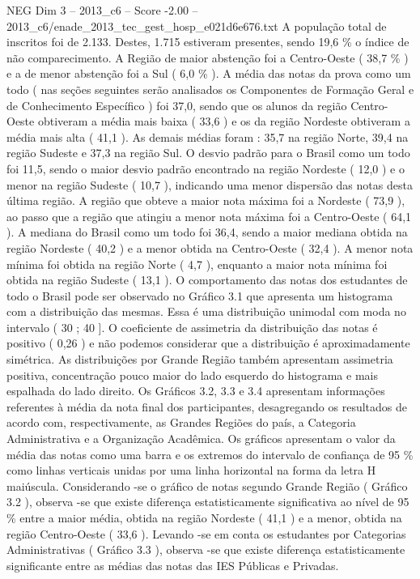\begin{textsample}{NEG Dim 3 – 2013\_c6 – Score -2.00 – 2013\_c6/enade\_2013\_tec\_gest\_hosp\_e021d6e676.txt}
A população total de inscritos foi de 2.133.
Destes, 1.715 estiveram presentes, sendo 19,6 \% o índice de não comparecimento.
A Região de maior abstenção foi a Centro-Oeste ( 38,7 \% ) e a de menor abstenção foi a Sul ( 6,0 \% ).
A média das notas da prova como um todo ( nas seções seguintes serão analisados os Componentes de Formação Geral e de Conhecimento Específico ) foi 37,0, sendo que os alunos da região Centro-Oeste obtiveram a média mais baixa ( 33,6 ) e os da região Nordeste obtiveram a média mais alta ( 41,1 ).
As demais médias foram : 35,7 na região Norte, 39,4 na região Sudeste e 37,3 na região Sul.
O desvio padrão para o Brasil como um todo foi 11,5, sendo o maior desvio padrão encontrado na região Nordeste ( 12,0 ) e o menor na região Sudeste ( 10,7 ), indicando uma menor dispersão das notas desta última região.
A região que obteve a maior nota máxima foi a Nordeste ( 73,9 ), ao passo que a região que atingiu a menor nota máxima foi a Centro-Oeste ( 64,1 ).
A mediana do Brasil como um todo foi 36,4, sendo a maior mediana obtida na região Nordeste ( 40,2 ) e a menor obtida na Centro-Oeste ( 32,4 ).
A menor nota mínima foi obtida na região Norte ( 4,7 ), enquanto a maior nota mínima foi obtida na região Sudeste ( 13,1 ).
O comportamento das notas dos estudantes de todo o Brasil pode ser observado no Gráfico 3.1 que apresenta um histograma com a distribuição das mesmas.
Essa é uma distribuição unimodal com moda no intervalo ( 30 ; 40 ].
O coeficiente de assimetria da distribuição das notas é positivo ( 0,26 ) e não podemos considerar que a distribuição é aproximadamente simétrica.
As distribuições por Grande Região também apresentam assimetria positiva, concentração pouco maior do lado esquerdo do histograma e mais espalhada do lado direito.
Os Gráficos 3.2, 3.3 e 3.4 apresentam informações referentes à média da nota final dos participantes, desagregando os resultados de acordo com, respectivamente, as Grandes Regiões do país, a Categoria Administrativa e a Organização Acadêmica.
Os gráficos apresentam o valor da média das notas como uma barra e os extremos do intervalo de confiança de 95 \% como linhas verticais unidas por uma linha horizontal na forma da letra H maiúscula.
Considerando -se o gráfico de notas segundo Grande Região ( Gráfico 3.2 ), observa -se que existe diferença estatisticamente significativa ao nível de 95 \% entre a maior média, obtida na região Nordeste ( 41,1 ) e a menor, obtida na região Centro-Oeste ( 33,6 ).
Levando -se em conta os estudantes por Categorias Administrativas ( Gráfico 3.3 ), observa -se que existe diferença estatisticamente significante entre as médias das notas das IES Públicas e Privadas.

\end{textsample}
